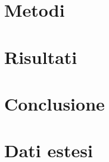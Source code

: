 \documentclass[
    rmp,
    reprint, 
    superscriptaddress, 
    altaffilletter, 
    amsmath, 
    amssymb, 
    a4paper]{revtex4-2}
\begin{document}

\section{Metodi}
\label{section:methods}


\section{Risultati}
\label{section:results}

\section{Conclusione}
\label{section:conclusion}

\appendix

\setcounter{table}{0}
\renewcommand{\thetable}{A-\Roman{table}}

\section{Dati estesi}
\end{document}
